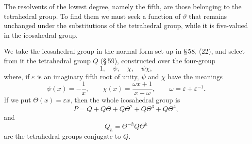 \documentclass[11pt]{article}
\providecommand{\eps}{\varepsilon}
\providecommand{\eps}{\varepsilon}
\begin{document}
The resolvents of the lowest degree, namely the fifth, are those belonging to the tetrahedral group. To find them we must seek a function of \(\vartheta\) that remains unchanged under the substitutions of the tetrahedral group, while it is five-valued in the icosahedral group.

We take the icosahedral group in the normal form set up in \S\,58, (22), and select from it the tetrahedral group \(Q\) (\S\,59), constructed over the four-group
\begin{equation}
1,\quad \psi,\quad \chi,\quad \psi\chi,
\tag{1}
\end{equation}
where, if \(\eps\) is an imaginary fifth root of unity, \(\psi\) and \(\chi\) have the meanings
\begin{equation}
\psi(x)=-\frac1x,\qquad \chi(x)=\frac{\omega x+1}{x-\omega},\qquad \omega=\eps+\eps^{-1}.
\tag{2}
\end{equation}
If we put \(\Theta(x)=\eps x\), then the whole icosahedral group is
\begin{equation}
P=Q+Q\Theta+Q\Theta^2+Q\Theta^3+Q\Theta^4,
\tag{3}
\end{equation}
and
\begin{equation}
Q_h=\Theta^{-h}Q\Theta^h
\tag{4}
\end{equation}
are the tetrahedral groups conjugate to \(Q\).
\end{document}
